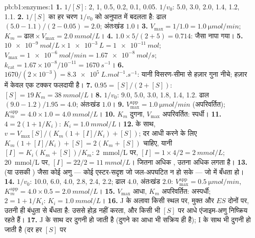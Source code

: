\begin{solution}{pb:b1:enzymes:1}
\textbf{1.} $1/[S]$: 2, 1, 0.5, 0.2, 0.1, 0.05. $1/v_0$: 5.0, 3.0, 2.0,
1.4, 1.2, 1.1.
\textbf{2.} $1/[S]$ का हर चरण $1/v_0$ को अनुपात में बदलता है: ढाल
$(5.0 - 1.1)/(2 - 0.05) = 2.0$; अंतःखंड $1.0$।
\textbf{3.} $V_{\max} = 1/1.0 = \qty{1.0}{\micro mol/min}$; $K_m =
\text{ढाल}\times V_{\max} = \qty{2.0}{mmol/L}$।
\textbf{4.} $1.0\times 5/(2 + 5) = 0.714$: जैसा नापा गया।
\textbf{5.} $\qty{10e-9}{mol/L}\times\qty{1e-3}{L} = \qty{1e-11}{mol}$;
$V_{\max} = \qty{1e-6}{mol/min} = \qty{1.67e-8}{mol/s}$;
$k_{\mathrm{cat}} = 1.67\times 10^{-8}/10^{-11} = \qty{1670}{s^{-1}}$।
\textbf{6.} $1670/(2\times 10^{-3}) = \qty{8.3e5}{L.mol^{-1}.s^{-1}}$:
यानी विसरण-सीमा से हज़ार गुना नीचे; हज़ार में केवल एक टक्कर
फलदायी है।
\textbf{7.} $0.95 = [S]/(2 + [S])$: $[S] = 19\,K_m = \qty{38}{mmol/L}$।
\textbf{8.} $1/v_0$: 9.0, 5.0, 3.0, 1.8, 1.4, 1.2. ढाल $(9.0 -
1.2)/1.95 = 4.0$; अंतःखंड $1.0$।
\textbf{9.} $V_{\max}^{\mathrm{app}} = \qty{1.0}{\micro mol/min}$
(अपरिवर्तित); $K_m^{\mathrm{app}} = 4.0\times 1.0 = \qty{4.0}{mmol/L}$।
\textbf{10.} $K_m$ दुगना, $V_{\max}$ अपरिवर्तित: स्पर्धी।
\textbf{11.} $4 = 2(1 + 1/K_i)$: $K_i = \qty{1.0}{mmol/L}$।
\textbf{12.}  के साथ, $v = V_{\max}[S]/(K_m(1 + [I]/K_i) +
[S])$; दर आधी करने के लिए $K_m(1 + [I]/K_i) + [S] = 2(K_m +
[S])$ चाहिए, यानी $[I] = K_i(K_m + [S])/K_m$: \qty{2}{mmol/L} पर, $[I] =
1\times 4/2 = \qty{2}{mmol/L}$; \qty{20}{mmol/L} पर, $[I] = 22/2 =
\qty{11}{mmol/L}$। जितना अधिक , उतना अधिक  लगता है।
\textbf{13.}  (या उसकी ) जैसा कोई अणु
--- कोई एस्टर-सदृश जो जल-अपघटित न हो सके --- जो
 में बँधता हो।
\textbf{14.} $1/v_0$: 10.0, 6.0, 4.0, 2.8, 2.4, 2.2; ढाल $4.0$,
अंतःखंड $2.0$: $V_{\max}^{\mathrm{app}} = \qty{0.5}{\micro mol/min}$,
$K_m^{\mathrm{app}} = 4.0\times 0.5 = \qty{2.0}{mmol/L}$।
\textbf{15.} $V_{\max}$ आधा, $K_m$ अपरिवर्तित: अस्पर्धी;
$2 = 1 + 1/K_i$: $K_i = \qty{1.0}{mmol/L}$।
\textbf{16.} J  के अलावा किसी स्थल पर, मुक्त  और
$ES$ दोनों पर, उतनी ही बंधुता से बँधता है:  उससे होड़ नहीं करता,
और किसी भी $[S]$ पर आधे एंजाइम-अणु निष्क्रिय रहते हैं।
\textbf{17.} J के साथ दर दुगनी हो जाती है (दुगने  का आधा भी
सक्रिय ही है); I के साथ भी दुगनी हो जाती है (दर हर $[S]$ पर

\end{solution}
